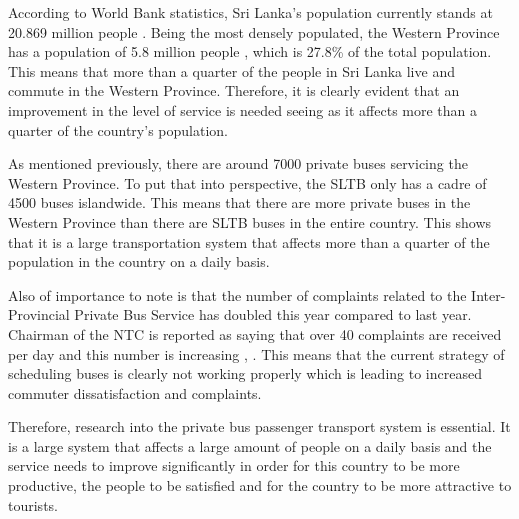 \documentclass[12pt, oneside]{report}
\begin{document}
According to World Bank statistics, Sri Lanka’s population currently stands at 20.869 million people \citep{WorldBank2013}. Being the most densely populated, the Western Province has a population of 5.8 million people \citep{DepartmentofCensusandStatistics2012}, which is 27.8\% of the total population. This means that more than a quarter of the people in Sri Lanka live and commute in the Western Province. Therefore, it is clearly evident that an improvement in the level of service is needed seeing as it affects more than a quarter of the country’s population.

As mentioned previously, there are around 7000 private buses servicing the Western Province. To put that into perspective, the SLTB only has a cadre of 4500 buses islandwide. This means that there are more private buses in the Western Province than there are SLTB buses in the entire country. This shows that it is a large transportation system that affects more than a quarter of the population in the country on a daily basis.

Also of importance to note is that the number of complaints related to the Inter-Provincial Private Bus Service has doubled this year compared to last year. Chairman of the NTC is reported as saying that over 40 complaints are received per day and this number is increasing \citep{Wickremasekara2012}, \citep{Range2012}. This means that the current strategy of scheduling buses is clearly not working properly which is leading to increased commuter dissatisfaction and complaints.

Therefore, research into the private bus passenger transport system is essential. It is a large system that affects a large amount of people on a daily basis and the service needs to improve significantly in order for this country to be more productive, the people to be satisfied and for the country to be more attractive to tourists.

\newpage
\end{document}
